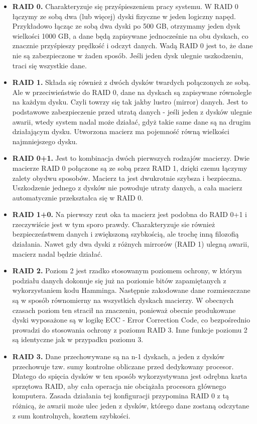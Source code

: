 \documentclass[12pt,a4paper]{article}
\begin{document}
	\begin{itemize}
		\item \textbf{RAID 0.} Charakteryzuje się przyśpieszeniem pracy systemu. W RAID 0 łączymy ze sobą dwa (lub więcej) dyski fizyczne w jeden logiczny napęd. Przykładowo łącząc ze sobą dwa dyski po 500 GB, otrzymamy jeden dysk wielkości 1000 GB, a dane będą zapisywane jednocześnie na obu dyskach, co znacznie przyśpieszy prędkość i odczyt danych. Wadą RAID 0 jest to, że dane nie są zabezpieczone w żaden sposób. Jeśli jeden dysk ulegnie uszkodzeniu, traci się wszystkie dane.
		\item \textbf{RAID 1.} Składa się również z dwóch dysków twardych połączonych ze sobą. Ale w przeciwieństwie do RAID 0, dane na dyskach są zapisywane równolegle na każdym dysku. Czyli towrzy się tak jakby lustro (mirror) danych. Jest to podstawowe zabezpieczenie przed utratą danych - jeśli jeden z dysków ulegnie awarii, wtedy system nadal może działać, gdyż takie same dane są na drugim działającym dysku. Utworzona macierz ma pojemność równą wielkości najmniejszego dysku.
		\item \textbf{RAID 0+1.} Jest to kombinacja dwóch pierwszych rodzajów macierzy. Dwie macierze RAID 0 połączone są ze sobą przez RAID 1, dzięki czemu łączymy zalety obydwu sposobów. Macierz ta jest dwukrotnie szybsza i bezpieczna. Uszkodzenie jednego z dysków nie powoduje utraty danych, a cała macierz automatycznie przekształca się w RAID 0.
		\item \textbf{RAID 1+0.} Na pierwszy rzut oka ta macierz jest podobna do RAID 0+1 i rzeczywiście jest w tym sporo prawdy. Charakteryzuje sie również bezpieczeństwem danych i zwiększoną szybkością, ale trochę inną filozofią działania. Nawet gdy dwa dyski z różnych mirrorów (RAID 1) ulegną awarii, macierz nadal będzie działać.
		\item \textbf{RAID 2.} Poziom 2 jest rzadko stosowanym poziomem ochrony, w którym podziału danych dokonuje się już na poziomie bitów zapamiętanych z wykorzystaniem kodu Hamminga. Następnie zakodowane dane rozmieszczane są w sposób równomierny na wszystkich dyskach macierzy. W obecnych czasach poziom ten stracił na znaczeniu, ponieważ obecnie produkowane dyski wyposażone są w logikę ECC - Error Correction Code, co bezpośrednio prowadzi do stosowania ochrony z poziomu RAID 3. Inne funkcje poziomu 2 są identyczne jak w przypadku poziomu 3.
		\item \textbf{RAID 3.} Dane przechowywane są na n-1 dyskach, a jeden z dysków przechowuje tzw. sumy kontrolne obliczane przed dedykowany procesor. Dlatego do spięcia dysków w ten sposób wykorzystywana jest odrębna karta sprzętowa RAID, aby cała operacja nie obciążała procesora głównego komputera. Zasada działania tej konfiguracji przypomina RAID 0 z tą różnicą, że awarii może ulec jeden z dysków, którego dane zostaną odczytane z sum kontrolnych, kosztem szybkości.

\end{itemize}
\end{document}
